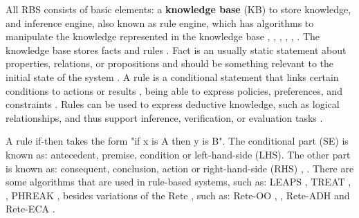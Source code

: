 All RBS consists of basic elements: a \textbf{knowledge base} (KB) to store knowledge, and inference engine, also known as rule engine, which has algorithms to manipulate the knowledge represented in the knowledge base \cite{grosan2011}, \cite{lucas1991}, \cite{gallacher1989}, \cite{hayesRoth1985}, \cite{buchanan1983}, \cite{abraham2005}. The knowledge base stores facts and rules \cite{hayesRoth1985}. Fact is an usually static statement about properties, relations, or propositions \cite{hayesRoth1985} and should be something relevant to the initial state of the system \cite{grosan2011}. A rule is a conditional statement that links certain conditions to actions or results \cite{abraham2005}, being able to express policies, preferences, and constraints \cite{gilman2015}. Rules can be used to express deductive knowledge, such as logical relationships, and thus support inference, verification, or evaluation tasks \cite{hayesRoth1985}.


A rule if-then takes the form "if x is A then y is B". The conditional part (SE) is known as: antecedent, premise, condition or left-hand-side (LHS). The other part is known as: consequent, conclusion, action or right-hand-side (RHS) \cite{grosan2011}, \cite{abraham2005}. There are some algorithms that are used in rule-based systems, such as: LEAPS \cite{batory1994}, TREAT \cite{wang1992}, \cite{miranker1991}, PHREAK \cite{salatino2016}, besides variations of the Rete \cite{forgy1982}, such as: Rete-OO \cite{sottara2010}, \cite{salatino2016}, Rete-ADH \cite{kim2014} and Rete-ECA \cite{lee2014}.

